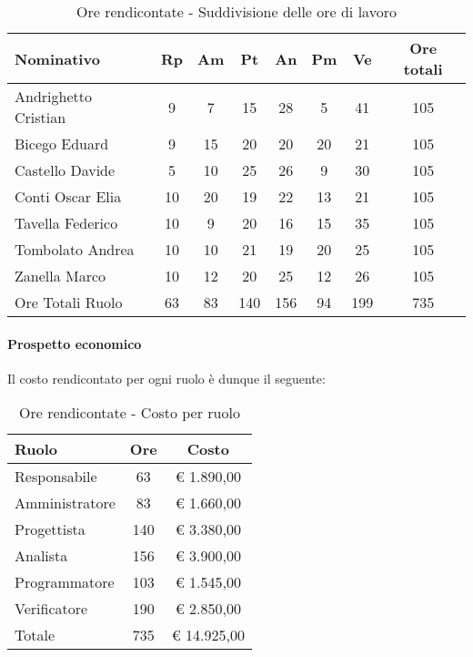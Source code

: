 \documentclass[../PianoProgetto.tex]{subfiles}
\begin{document}
					\begin{table}[h]
		\centering
	
		\begin{tabular}{l * {7}{c}}
			\toprule
			Nominativo & Rp & Am & Pt & An & Pm & Ve & Ore totali \\
			\midrule
			Andrighetto Cristian & 9 & 7 & 15 & 28 & 5 & 41 &	105 \\
			\midrule
			Bicego Eduard & 9 & 15 & 20 & 20 & 20 & 21 & 105 \\
			\midrule
			Castello Davide & 5 & 10 & 25 & 26 & 9 & 30 & 105 \\
			\midrule
			Conti Oscar Elia & 10 & 20 & 19 & 22 & 13 & 21 & 105 \\
			\midrule
			Tavella Federico &	10 & 9 & 20 & 16 & 15 & 35 & 105 \\
			\midrule
			Tombolato Andrea & 10 & 10 & 21 & 19 & 20 & 25 & 105 \\
			\midrule
			Zanella Marco & 10 & 12 & 20 & 25 & 12 & 26 & 105 \\
			\midrule			
			Ore Totali Ruolo & 63 & 83 & 140 & 156 & 94 & 199 & 735 \\
			\bottomrule
			
		\end{tabular}
		
		\caption{Ore rendicontate - Suddivisione delle ore di lavoro}
		\label{tab:rendicontate_ore}
		
	\end{table}
	
	
	\paragraph{Prospetto economico}
					Il costo rendicontato per ogni ruolo è dunque il seguente:
					\begin{table}[h]
		\centering
	
		\begin{tabular}{l * {2}{c}}
			\toprule
			Ruolo & Ore & Costo \\
			\midrule
			Responsabile &	63 & \euro{} 1.890,00 \\
			\midrule
			Amministratore & 83 & \euro{} 1.660,00 \\
			\midrule
			Progettista & 140 & \euro{} 3.380,00 \\
			\midrule
			Analista & 156 & \euro{} 3.900,00 \\
			\midrule
			Programmatore & 103 & \euro{} 1.545,00 \\
			\midrule
			Verificatore & 190 & \euro{} 2.850,00 \\
			\midrule		
			Totale & 735 & \euro{} 14.925,00 \\
			\bottomrule
			
		\end{tabular}
		
		\caption{Ore rendicontate - Costo per ruolo}
		\label{tab:rendicontate_costo}
		
	\end{table}
			
\end{document}
